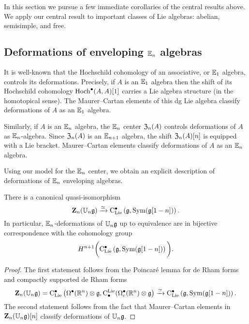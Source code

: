 \documentclass[11pt]{amsart}
\numberwithin{equation}{section}
\begin{document}
In this section we pursue a few immediate corollaries of the central results above.
We apply our central result to important classes of Lie algebras: 
abelian, semisimple, and free.

\subsection{Deformations of enveloping $\mathbb E_n$ algebras}
It is well-known that the Hochschild cohomology of an associative, or $\mathbb E_1$ algebra, controls its deformations. 
Precisely, if $A$ is an $\mathbb E_1$ algebra then the shift of its Hochschild cohomology ${\rm Hoch}^\bullet (A , A)[1]$ carries a Lie algebra structure (in the homotopical sense). 
The Maurer--Cartan elements of this dg Lie algebra classify deformations of $A$ as an $\mathbb E_1$ algebra. 

Similarly, if $A$ is an $\mathbb E_n$ algebra, the $\mathbb E_n$ center $\mathfrak Z_n(A)$ controls deformations of $A$ as $\mathbb E_n$-algebra. 
Since $\mathfrak Z_n(A)$ is an $\mathbb E_{n+1}$ algebra, the shift $\mathfrak Z_n(A)[n]$ is equipped with a Lie bracket. 
Maurer--Cartan elements classify deformations of $A$ as an $\mathbb E_{n}$ algebra. 

Using our model for the $\mathbb E_n$ center, we obtain an explicit description 
of deformations of $\mathbb E_n$ enveloping algebras. 

\begin{prp}\label{prop:def}
There is a canonical quasi-isomorphism 
\begin{equation}
\label{eqn:def}
\mathbf Z_n(\mathbb U_n \mathfrak g) \xrightarrow{\simeq} {\rm C}_{\rm Lie}^\bullet\left(\mathfrak g, {\rm Sym}(\mathfrak g[1-n]) \right) .
\end{equation}
In particular, $\mathbb E_n$-deformations of $\mathbb U_n \mathfrak g$ up to equivalence are in bijective correspondence with the cohomology group
\[
H^{n+1} \bigg({\rm C}_{{\rm Lie}}^\bullet \left(\mathfrak g , {\rm Sym}(\mathfrak g[1-n]) \right) \bigg).
\]
\end{prp}
\begin{proof}
The first statement follows from the Poincar\'{e} lemma for de Rham forms and compactly supported de Rham forms
\[
\mathbf Z_n(\mathbb U_n \mathfrak g) = {\rm C}_{{\rm Lie}}^\bullet\left(\Omega^\bullet(\mathbb R^n) \otimes \mathfrak g, {\rm C}^{\rm Lie}_\bullet(\Omega^\bullet_c (\mathbb R^n) \otimes \mathfrak g\right) \xrightarrow{\simeq} {\rm C}_{\rm Lie}^\bullet\left(\mathfrak g, {\rm Sym}(\mathfrak g[1-n]) \right) .
\]
The second statement follows from the fact that Maurer--Cartan elements in $\mathbf Z_n(\mathbb U_n \mathfrak g)[n]$ classify deformations of $\mathbb U_n \mathfrak g$. 
\end{proof}
\end{document}
